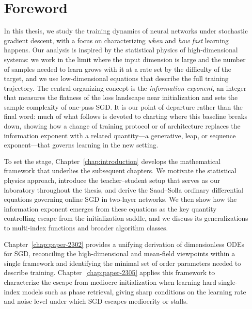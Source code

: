 \chapter*{Foreword}

In this thesis, we study the training dynamics of neural networks under stochastic gradient
descent, with a focus on characterizing \emph{when} and \emph{how fast} learning happens.
Our analysis is inspired by the statistical physics of high-dimensional systems: we work
in the limit where the input dimension is large and the number of samples needed to
learn grows with it at a rate set by the difficulty of the target, and we use
low-dimensional equations that describe the full training trajectory.
The central organizing concept is the \emph{information exponent}, an integer that measures
the flatness of the loss landscape near initialization and sets the sample complexity of
one-pass SGD. It is our point of departure rather than the final word: much of what follows
is devoted to charting where this baseline breaks down, showing how a change of training
protocol or of architecture replaces the information exponent with a related quantity---a
generative, leap, or sequence exponent---that governs learning in the new setting.

To set the stage, Chapter~\ref{chap:introduction} develops the mathematical framework
that underlies the subsequent chapters.
We motivate the statistical physics approach, introduce the teacher--student setup that
serves as our laboratory throughout the thesis, and derive the Saad--Solla ordinary
differential equations governing online SGD in two-layer networks.
We then show how the information exponent emerges from these equations as the key
quantity controlling escape from the initialization saddle, and we discuss its
generalizations to multi-index functions and broader algorithm classes.

Chapter~\ref{chap:paper-2302} provides a unifying derivation of dimensionless ODEs for
SGD, reconciling the high-dimensional and mean-field viewpoints within a single framework
and identifying the minimal set of order parameters needed to describe training.
Chapter~\ref{chap:paper-2305} applies this framework to characterize the escape from
mediocre initialization when learning hard single-index models such as phase retrieval,
giving sharp conditions on the learning rate and noise level under which SGD escapes
mediocrity or stalls.

